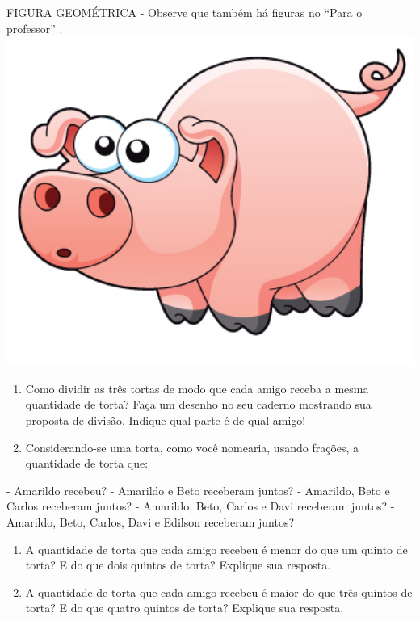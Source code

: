 \documentclass[a4,12pt]{book}
\begin{document}
\begin{imagem*}[breakable]{}{}    FIGURA GEOMÉTRICA - Observe que também há figuras no   ``Para o professor''  .  
    \includegraphics[width=420pt, keepaspectratio]{pig}  
\end{imagem*}

\begin{enumerate} [\quad a)] %
  \item     Como dividir as três tortas de modo que cada amigo receba a mesma quantidade de torta? Faça um desenho no seu caderno mostrando sua proposta de divisão. Indique qual parte é de qual amigo!
  \item     Considerando-se uma torta, como você nomearia, usando frações, a quantidade de torta que: 
\end{enumerate} %

        - Amarildo recebeu? 
        - Amarildo e Beto receberam juntos? 
        - Amarildo, Beto e Carlos receberam juntos? 
        - Amarildo, Beto, Carlos e Davi receberam juntos?
        - Amarildo, Beto, Carlos, Davi e Edilson receberam juntos?
\begin{enumerate} [\quad a)] %
  \item     A quantidade de torta que cada amigo recebeu é menor do que um quinto de torta? E do que dois quintos de torta? Explique sua resposta.
  \item     A quantidade de torta que cada amigo recebeu é maior do que três quintos de torta? E do que quatro quintos de torta? Explique sua resposta.
\end{enumerate} %
\end{document}
